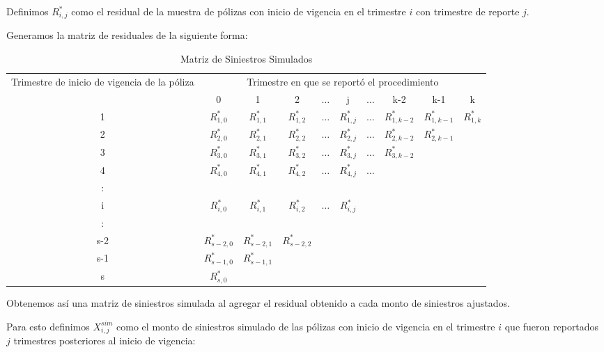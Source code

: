 \documentclass[11pt,twoside,openright,spanish]{report}
\numberwithin{equation}{chapter}
\numberwithin{figure}{chapter}
\numberwithin{table}{chapter}
\begin{document}
	Definimos $R_{i,j}^{*}$ como el residual de la muestra de pólizas con inicio de vigencia en el trimestre $i$ con trimestre de reporte $j$. 
	
	Generamos la matriz de residuales de la siguiente forma:
	
	\begin{table}[H]
		\centering
			\caption{Matriz de Siniestros Simulados}
		\begin{tabularx}{\linewidth}{ c |ccccccccc}
			\multirow{2}{4cm}{Trimestre de inicio de vigencia de la póliza}& \multicolumn{9}{c}{Trimestre en que se reportó el procedimiento} \\
			& 0  & 1 & 2 & $ \dots $ & j & $\dots $ & k-2 & k-1 &  k\\
			\midrule
			1      &  $R_{1,0}^{*}$ & $R_{1,1}^{*}$ & $R_{1,2}^{*}$ & $ \dots $ & $R_{1,j}^{*}$ & $ \dots $ & $R_{1,k-2}^{*}$ & $R_{1,k-1}^{*}$ & $R_{1,k}^{*}$ \\
			2      &  $R_{2,0}^{*}$ & $R_{2,1}^{*}$ & $R_{2,2}^{*}$ & $ \dots $ & $R_{2,j}^{*}$ & $ \dots $ & $R_{2,k-2}^{*}$ & $R_{2,k-1}^{*}$ & \\
			3      &  $R_{3,0}^{*}$ & $R_{3,1}^{*}$ & $R_{3,2}^{*}$ & $ \dots $ & $R_{3,j}^{*}$ & $ \dots $ & $R_{3,k-2}^{*}$ & & \\
			4      &  $R_{4,0}^{*}$ & $R_{4,1}^{*}$ & $R_{4,2}^{*}$ & $ \dots $ & $R_{4,j}^{*}$ & $ \dots $ & & & \\
			:      & & & & & & & & & \\
			i      &  $R_{i,0}^{*}$ & $R_{i,1}^{*}$ & $R_{i,2}^{*}$ & $ \dots $ & $R_{i,j}^{*}$ & & & & \\
			:      & & & & & & & & & \\
			s-2      &  $R_{s-2,0}^{*}$ & $R_{s-2,1}^{*}$ & $R_{s-2,2}^{*}$ & & & & & & \\
			s-1      &  $R_{s-1,0}^{*}$ & $R_{s-1,1}^{*}$ & & & & & & & \\
			s      &  $R_{s,0}^{*}$ & & & & & & & & \\
		\end{tabularx}
	\end{table}

	Obtenemos así una matriz de siniestros simulada al agregar el residual obtenido a cada monto de siniestros ajustados.
	
	Para esto definimos $X_{i,j}^{sim}$ como el monto de siniestros simulado de las pólizas con inicio de vigencia en el trimestre $i$ que fueron reportados $j$ trimestres posteriores al inicio de vigencia:
	
\end{document}
